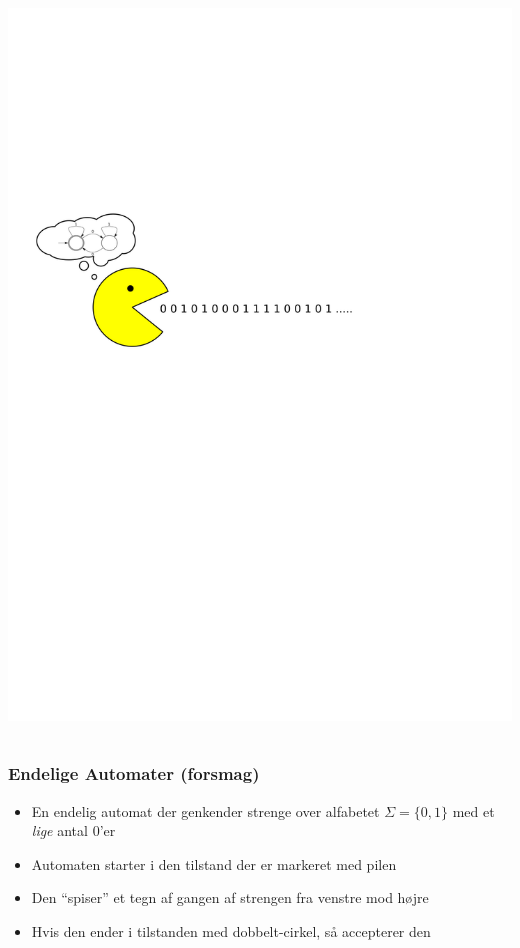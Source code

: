 \documentclass[]{beamer}
\begin{document}
\begin{frame}
\begin{columns}
\begin{column}{0.5\textwidth}
      \includegraphics[width=\textwidth]{images/1_seminar_pacman}
    \end{column}    
  \end{columns}

\frametitle{Endelige Automater (forsmag)}
\begin{itemize}
\item En endelig automat der genkender strenge over alfabetet $Σ = \{0,1\}$ med et \emph{lige} antal $0$'er
\item Automaten starter i den tilstand der er markeret med pilen
\item Den ``spiser'' et tegn af gangen af strengen fra venstre mod højre
\item Hvis den ender i tilstanden med dobbelt-cirkel, så accepterer den
\end{itemize}
\end{frame}
\end{document}
